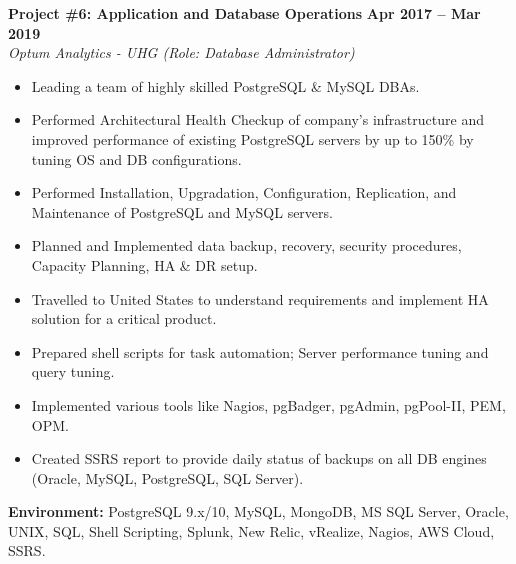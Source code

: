\documentclass[10pt,a4paper]{article}
\begin{document}
\noindent
\begin{minipage}{\textwidth}
    \textbf{\large Project \#6: Application and Database Operations} \hfill \textbf{Apr 2017 -- Mar 2019} \\
    \textit{Optum Analytics - UHG (Role: Database Administrator)}
    \begin{itemize}[leftmargin=*, noitemsep, topsep=2pt]
        \item Leading a team of highly skilled PostgreSQL \& MySQL DBAs.
        \item Performed Architectural Health Checkup of company's infrastructure and improved performance of existing PostgreSQL servers by up to 150\% by tuning OS and DB configurations.
        \item Performed Installation, Upgradation, Configuration, Replication, and Maintenance of PostgreSQL and MySQL servers.
        \item Planned and Implemented data backup, recovery, security procedures, Capacity Planning, HA \& DR setup.
        \item Travelled to United States to understand requirements and implement HA solution for a critical product.
        \item Prepared shell scripts for task automation; Server performance tuning and query tuning.
        \item Implemented various tools like Nagios, pgBadger, pgAdmin, pgPool-II, PEM, OPM.
        \item Created SSRS report to provide daily status of backups on all DB engines (Oracle, MySQL, PostgreSQL, SQL Server).
    \end{itemize}
    \small{\textbf{Environment:} PostgreSQL 9.x/10, MySQL, MongoDB, MS SQL Server, Oracle, UNIX, SQL, Shell Scripting, Splunk, New Relic, vRealize, Nagios, AWS Cloud, SSRS.}
\end{minipage}
\vspace{10pt}
\end{document}
